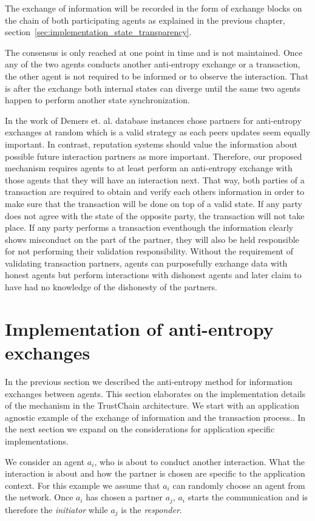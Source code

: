 The exchange of information will be recorded in the form of exchange blocks on the chain of both 
participating agents as explained in the previous chapter, section~\ref{sec:implementation_state_transparency}.

The consensus is only reached at one point in time and is not maintained. Once any of the two agents
conducts another anti-entropy exchange or a transaction, the other agent is not required to be 
informed or to observe the interaction. That is after the exchange both internal states can diverge
until the same two agents happen to perform another state synchronization. 

In the work of Demers et. al. database instances chose partners for anti-entropy exchanges at random
which is a valid strategy as each peers updates seem equally important. In contrast, reputation 
systems should value the information about possible future interaction partners as more important.
Therefore, our proposed mechanism requires agents to at least perform an anti-entropy exchange with
those agents that they will have an interaction next. That way, both parties of a transaction are 
required to obtain and verify each others information in order to make sure that the transaction 
will be done on top of a valid state. If any party does not agree with the state of the opposite 
party, the transaction will not take place. If any party performs a transaction eventhough the 
information clearly shows misconduct on the part of the partner, they will also be held responsible 
for not performing their validation responsibility. Without the requirement of validating transaction
partners, agents can purposefully exchange data with honest agents but perform interactions with 
dishonest agents and later claim to have had no knowledge of the dishonesty of the partners. 

\section{Implementation of anti-entropy exchanges}
In the previous section we described the anti-entropy method for information exchanges between 
agents. This section elaborates on the implementation details of the mechanism in the TrustChain 
architecture. We start with an application agnostic example of the exchange of information and the 
transaction process.. In the next section we expand on the considerations for application specific 
implementations.

We consider an agent $a_i$, who is about to conduct another interaction. What the interaction is 
about and how the partner is chosen are specific to the application context. For this example we 
assume that $a_i$ can randomly choose an agent from the network. Once $a_i$ has chosen a partner $a_j$,
$a_i$ starts the communication and is therefore the \textit{initiator} while $a_j$ is the \textit{responder}. 

